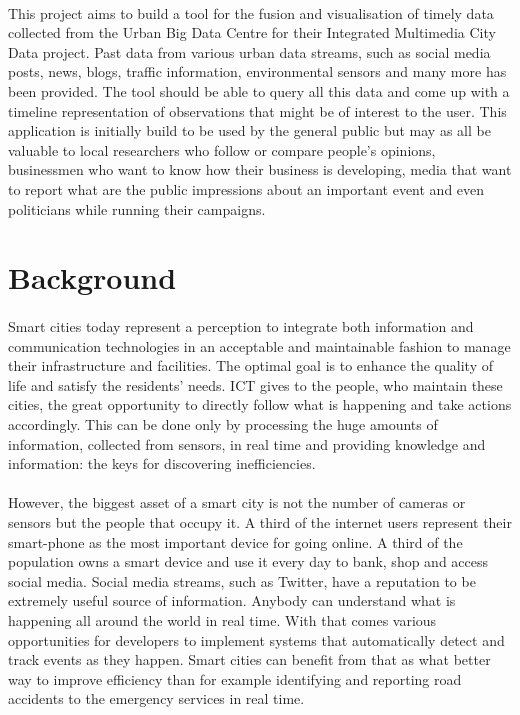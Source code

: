 \documentclass{l4proj}
\begin{document}
\paragraph{}
This project aims to build a tool for the fusion and visualisation of timely data collected from the Urban Big Data Centre for their Integrated Multimedia City Data project. Past data from various urban data streams, such as social media posts, news, blogs, traffic information, environmental sensors and many more has been provided. The tool should be able to query all this data and come up with a timeline representation of observations that might be of interest to the user. This application is initially build to be used by the general public but may as all be valuable to local researchers who follow or compare people’s opinions, businessmen who want to know how their business is developing, media that want to report what are the public impressions about an important event and even politicians while running their campaigns.   

\section{Background}
\paragraph{}
Smart cities today represent a perception to integrate both information and communication technologies in an acceptable and maintainable fashion to manage their infrastructure and facilities. The optimal goal is to enhance the quality of life and satisfy the residents’ needs. ICT gives to the people, who maintain these cities, the great opportunity to directly follow what is happening and take actions accordingly. This can be done only by processing the huge amounts of information, collected from sensors, in real time and providing knowledge and information: the keys for discovering inefficiencies. 
\paragraph{}
However, the biggest asset of a smart city is not the number of cameras or sensors but the people that occupy it. A third of the internet users\cite{ofcomreport1} represent their smart-phone as the most important device for going online. A third of the population owns a smart device and use it every day to bank, shop and access social media. Social media streams, such as Twitter, have a reputation to be extremely useful source of information. Anybody can understand what is happening all around the world in real time. With that comes various opportunities for developers to implement systems that automatically detect and track events as they happen. Smart cities can benefit from that as what better way to improve efficiency than for example identifying and reporting road accidents to the emergency services in real time.
\end{document}
